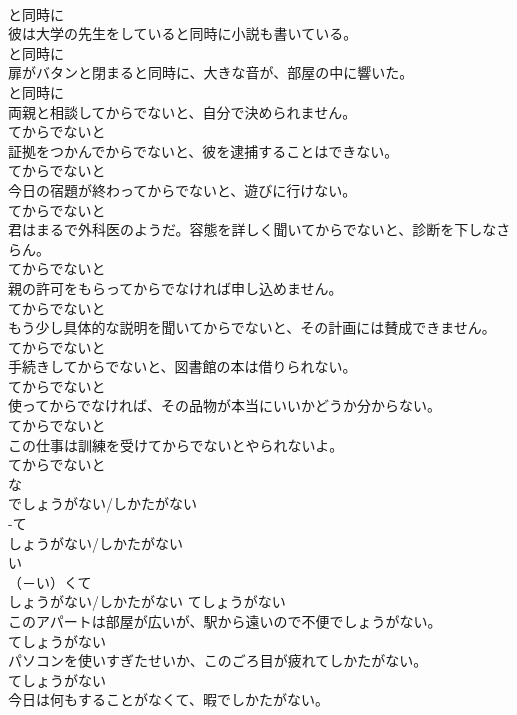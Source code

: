 \documentclass[8pt]{extreport}
\begin{document}
\begin{CJK}{UTF8}{min}
\\	と同時に
\\	彼は大学の先生をしていると同時に小説も書いている。	
\\	と同時に
\\	扉がバタンと閉まると同時に、大きな音が、部屋の中に響いた。	
\\	と同時に
\\	両親と相談してからでないと、自分で決められません。	
\\	てからでないと
\\	証拠をつかんでからでないと、彼を逮捕することはできない。	
\\	てからでないと
\\	今日の宿題が終わってからでないと、遊びに行けない。	
\\	てからでないと
\\	君はまるで外科医のようだ。容態を詳しく聞いてからでないと、診断を下しなさらん。	
\\	てからでないと
\\	親の許可をもらってからでなければ申し込めません。	
\\	てからでないと
\\	もう少し具体的な説明を聞いてからでないと、その計画には賛成できません。	
\\	てからでないと
\\	手続きしてからでないと、図書館の本は借りられない。	
\\	てからでないと
\\	使ってからでなければ、その品物が本当にいいかどうか分からない。	
\\	てからでないと
\\	この仕事は訓練を受けてからでないとやられないよ。	
\\	てからでないと
\\	な
\\	でしょうがない/しかたがない	
\\	-て
\\	しょうがない/しかたがない	
\\	い
\\	（－い）くて 
\\	しょうがない/しかたがない	てしょうがない
\\	このアパートは部屋が広いが、駅から遠いので不便でしょうがない。	
\\	てしょうがない
\\	パソコンを使いすぎたせいか、このごろ目が疲れてしかたがない。	
\\	てしょうがない
\\	今日は何もすることがなくて、暇でしかたがない。	

\end{CJK}
\end{document}
